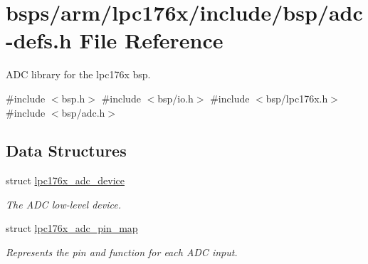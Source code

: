 \hypertarget{adc-defs_8h}{}\section{bsps/arm/lpc176x/include/bsp/adc-\/defs.h File Reference}
\label{adc-defs_8h}


A\+DC library for the lpc176x bsp.  


{\ttfamily \#include $<$bsp.\+h$>$}\newline
{\ttfamily \#include $<$bsp/io.\+h$>$}\newline
{\ttfamily \#include $<$bsp/lpc176x.\+h$>$}\newline
{\ttfamily \#include $<$bsp/adc.\+h$>$}\newline
\subsection*{Data Structures}
\begin{DoxyCompactItemize}
\item 
struct \mbox{\hyperlink{structlpc176x__adc__device}{lpc176x\+\_\+adc\+\_\+device}}
\begin{DoxyCompactList}\small\item\em The A\+DC low-\/level device. \end{DoxyCompactList}\item 
struct \mbox{\hyperlink{structlpc176x__adc__pin__map}{lpc176x\+\_\+adc\+\_\+pin\+\_\+map}}
\begin{DoxyCompactList}\small\item\em Represents the pin and function for each A\+DC input. \end{DoxyCompactList}\end{DoxyCompactItemize}
